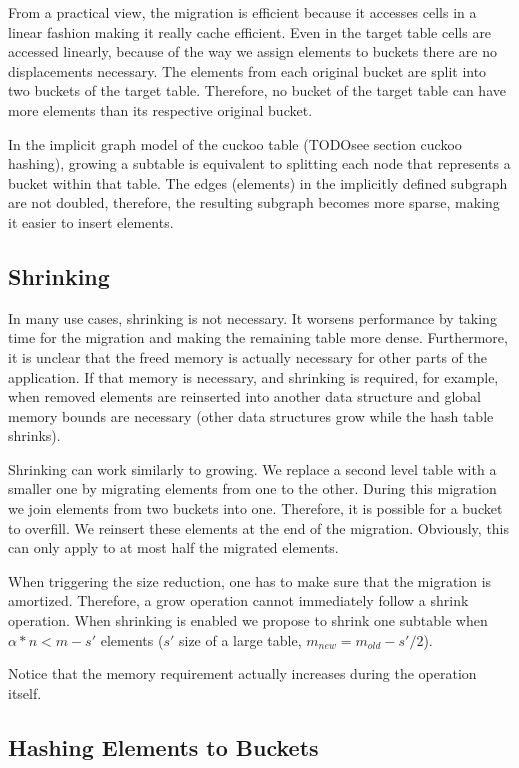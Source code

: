 \documentclass[a4paper,UKenglish]{lipics-v2016}
\begin{document}
From a practical view, the migration is efficient because it accesses
cells in a linear fashion making it really cache efficient.  Even in
the target table cells are accessed linearly, because of the way we
assign elements to buckets there are no displacements necessary.  The
elements from each original bucket are split into two buckets of the
target table.  Therefore, no bucket of the target table can have more
elements than its respective original bucket.

In the implicit graph model of the cuckoo table (TODOsee section
cuckoo hashing), growing a subtable is equivalent to
splitting each node that represents a bucket within that table. The
edges (elements) in the implicitly defined subgraph are not doubled,
therefore, the resulting subgraph becomes more sparse, making it
easier to insert elements.

\subsection{Shrinking}
In many use cases, shrinking is not necessary.  It worsens performance
by taking time for the migration and making the remaining table more
dense.  Furthermore, it is unclear that the freed memory is actually
necessary for other parts of the application.  If that memory is
necessary, and shrinking is required, for example, when removed
elements are reinserted into another data structure and global memory
bounds are necessary (other data structures grow while the hash table
shrinks).

Shrinking can work similarly to growing. We replace a second level
table with a smaller one by migrating elements from one to the
other.  During this migration we join elements from two buckets into
one. Therefore, it is possible for a bucket to overfill.  We reinsert
these elements at the end of the migration.  Obviously, this can only
apply to at most half the migrated elements.

When triggering the size reduction, one has to make sure that the
migration is amortized. Therefore, a grow operation cannot immediately
follow a shrink operation.  When shrinking is enabled we propose to
shrink one subtable when $\alpha*n < m-s'$ elements ($s'$ size of a
large table, $m_{new} = m_{old} -s'/2$).

Notice that the memory requirement actually increases during the
operation itself.
\subsection{Hashing Elements to Buckets}
\end{document}
